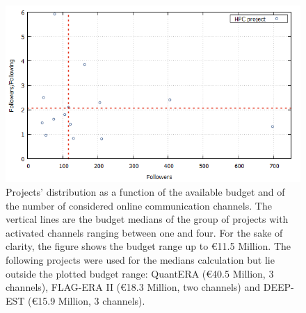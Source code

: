 \begin{figure}[!t] 
 \begin{center}
 \includegraphics[scale=0.4]{Images/HPC_influence.png}
 \caption{Projects' distribution as a function of the available budget and of the number of considered online communication channels. The vertical lines are the budget medians of the group of projects with activated channels ranging between one and four. For the sake of clarity, the figure shows the budget range up to \euro 11.5 Million. The following projects were used for the medians calculation but lie outside the plotted budget range: QuantERA (\euro 40.5 Million, 3 channels), FLAG-ERA II (\euro 18.3 Million, two channels) and DEEP-EST (\euro 15.9 Million, 3 channels).}
 \label{HPC_influence_plot}
 \end{center}
\end{figure}